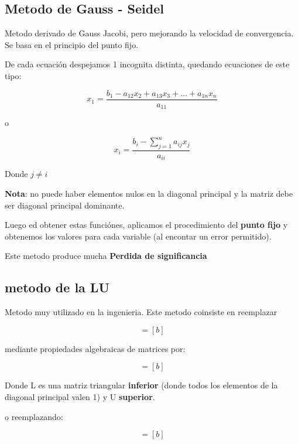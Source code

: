 \documentclass[10pt]{article}
\begin{document}
\subsection{Metodo de Gauss - Seidel}

Metodo derivado de  Gauss Jacobi, pero mejorando la velocidad de convergencia.
Se basa en el principio del punto fijo.

De cada ecuación despejamos 1 incognita distinta, quedando ecuaciones de este tipo:

\begin{equation}
	x_1 = \dfrac{b_1 - a_{12}x_2 + a_{13}x_3 + \dots + a_{1n}x_n}{a_{11}}
\end{equation}

o

\begin{equation}
	x_i = \dfrac{b_i- \sum_{j=1}^n a_{ij}x_j}{a_{ii}}
\end{equation}

Donde $j \neq i$

\textbf{Nota}: no puede haber elementos nulos en la diagonal principal y
la matriz debe ser diagonal principal dominante.

Luego ed obtener estas funciónes, aplicamos el procedimiento del \textbf{punto fijo}
y obtenemos los valores para cada variable (al encontar un error permitido).

Este metodo produce mucha \textbf{Perdida de significancia}

\subsection{metodo de la LU}

Metodo muy utilizado en la ingenieria. Este metodo coinsiste en reemplazar

\begin{equation}
	[A][x] = [b]
\end{equation}

mediante propiedades algebraicas de matrices por:

\begin{equation}
	[LU][x] = [b]
\end{equation}

Donde L es una matriz triangular \textbf{inferior} (donde todos 
los elementos de la diagonal principal valen 1) y U \textbf{superior}.

o reemplazando:

\begin{equation}
	[L][y] = [b]
\end{equation}
\end{document}

